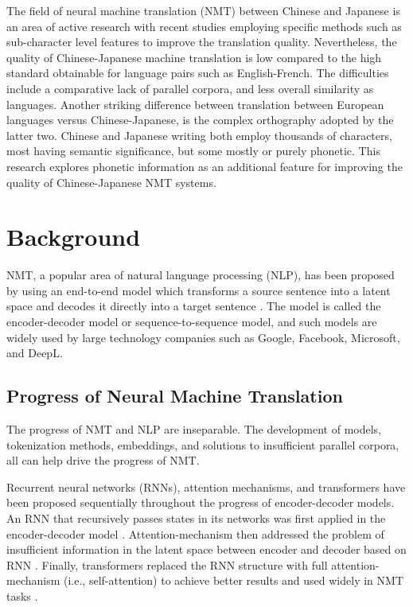 \hspace{24pt}

The field of neural machine translation (NMT) between Chinese and Japanese is an area of active research with recent studies employing specific methods such as sub-character level features to improve the translation quality. Nevertheless, the quality of Chinese-Japanese machine translation is low compared to the high standard obtainable for language pairs such as English-French. The difficulties include a comparative lack of parallel corpora, and less overall similarity as languages. Another striking difference between translation between European languages versus Chinese-Japanese, is the complex orthography adopted by the latter two. Chinese and Japanese writing both employ thousands of characters, most having semantic significance, but some mostly or purely phonetic.
This research explores phonetic information as an additional feature for improving the quality of Chinese-Japanese NMT systems.

\section{Background} \label{sec:background}

NMT, a popular area of natural language processing (NLP), has been proposed by using an end-to-end model which transforms a source sentence into a latent space and decodes it directly into a target sentence \cite{sutskever2014sequence, cho2014learning}. The model is called the encoder-decoder model or sequence-to-sequence model, and such models are widely used by large technology companies such as Google, Facebook, Microsoft, and DeepL.

\subsection{Progress of Neural Machine Translation} \label{sec:nmt}

The progress of NMT and NLP are inseparable. The development of models, tokenization methods, embeddings, and solutions to insufficient parallel corpora, all can help drive the progress of NMT.

Recurrent neural networks (RNNs), attention mechanisms, and transformers have been proposed sequentially throughout the progress of encoder-decoder models. An RNN that recursively passes states in its networks was first applied in the encoder-decoder model \cite{cho2014learning}. Attention-mechanism then addressed the problem of insufficient information in the latent space between encoder and decoder based on RNN \cite{bahdanau2014neural}. Finally, transformers replaced the RNN structure with full attention-mechanism (i.e., self-attention) to achieve better results and used widely in NMT tasks \cite{NIPS2017_3f5ee243}. 

